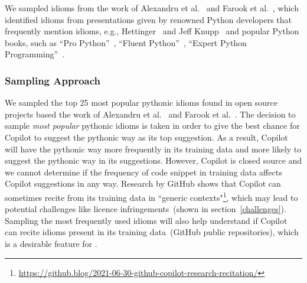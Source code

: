 We sampled idioms from the work of Alexandru et al.~\cite{Alexandru2018} and Farook et al.~\cite{idioms}, which identified idioms from presentations given by renowned Python developers that frequently mention idioms, e.g., Hettinger~\cite{hettinger} and Jeff Knupp~\cite{knupp} and 
popular Python books, such as ``Pro Python''~\cite{Alchin2010}, ``Fluent Python''~\cite{fluent}, ``Expert Python Programming''~\cite{expert}.


\subsubsection{Sampling Approach}
\label{sampling}
We sampled the top 25 most popular pythonic idioms found in open source projects based the work of Alexandru et al.~\cite{Alexandru2018} and Farook et al.~\cite{idioms}.
The decision to sample \emph{most popular} pythonic idioms is taken in order to give the best chance for Copilot to suggest the pythonic way as its top suggestion. As a result, Copilot will have the pythonic way more frequently in its training data and more likely to suggest the pythonic way in its suggestions.
However, Copilot is closed source and we cannot determine if the frequency of code snippet in training data affects Copilot suggestions in any way. Research by GitHub shows that Copilot can sometimes recite from its training data in ``generic contexts"\footnote{\url{https://github.blog/2021-06-30-github-copilot-research-recitation/}}, which may lead to potential challenges like licence infringements~(shown in section~\ref{challenges}). 
Sampling the most frequently used idioms will also help understand if Copilot can recite idioms present in its training data~(GitHub public repositories), which is a desirable feature for \cct{}.
